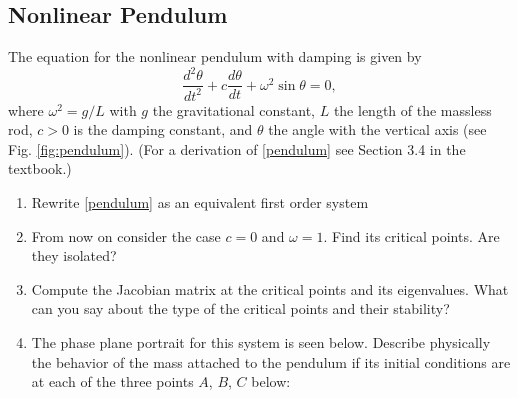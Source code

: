 \documentclass[11pt]{article}
\renewcommand{\th}{\theta}
\newcommand{\w}{\omega}
\begin{document}
\subsection*{Nonlinear Pendulum}
The equation for the nonlinear pendulum with damping is given by 
\begin{equation}\label{pendulum}
	\frac{d^2\th}{dt^2}+c\frac{d\th}{dt}+\w^2\sin\th=0,
\end{equation}
where $\w^2=g/L$ with $g$ the gravitational constant, $L$ the length of the massless rod, $c>0$ is the damping constant, and $\th$ the angle with the vertical axis (see Fig. \ref{fig:pendulum}).
(For a derivation of \eqref{pendulum} see Section 3.4 in the textbook.)
\begin{enumerate}[resume]
	\item Rewrite \eqref{pendulum} as an equivalent first order system
	\item From now on consider the case $c=0$ and $\w=1$. Find its critical points. Are they isolated?
	\item  Compute the Jacobian matrix at the critical points and its eigenvalues. What can you say about the type of the critical points and their stability?
	\item The phase plane portrait for this system is seen below. Describe physically the behavior of the mass attached to the pendulum if its initial conditions are at each of the three points $A$, $B$, $C$ below:
	

\end{enumerate}
\end{document}
